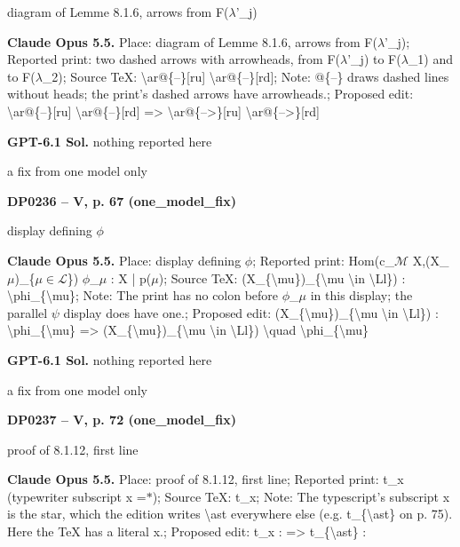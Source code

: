 diagram of Lemme 8.1.6, arrows from F(\ensuremath{\lambda}'\_j)\par
\textbf{Claude Opus 5.5.} Place: diagram of Lemme 8.1.6, arrows from F(\ensuremath{\lambda}'\_j); Reported print: two dashed arrows with arrowheads, from F(\ensuremath{\lambda}'\_j) to F(\ensuremath{\lambda}\_1) and to F(\ensuremath{\lambda}\_2); Source TeX: \textbackslash{}ar@\{--\}[ru] \textbackslash{}ar@\{--\}[rd]; Note: @\{--\} draws dashed lines without heads; the print's dashed arrows have arrowheads.; Proposed edit: \textbackslash{}ar@\{--\}[ru] \textbackslash{}ar@\{--\}[rd] =\allowbreak > \textbackslash{}ar@\{-->\}[ru] \textbackslash{}ar@\{-->\}[rd]\par
\textbf{GPT-6.1 Sol.} nothing reported here\par
a fix from one model only\par
\par\noindent\hypertarget{DP0236}{}\textbf{DP0236 -- V, p. 67 (one\_model\_fix)}\par
display defining \ensuremath{\phi}\par
\textbf{Claude Opus 5.5.} Place: display defining \ensuremath{\phi}; Reported print: Hom(c\_\ensuremath{\mathcal{M}} X,(X\_\ensuremath{\mu})\_\{\ensuremath{\mu}\ensuremath{\in}\ensuremath{\mathcal{L}}\})   \ensuremath{\phi}\_\ensuremath{\mu} : X | p(\ensuremath{\mu}); Source TeX: (X\_\{\textbackslash{}mu\})\_\{\textbackslash{}mu \textbackslash{}in \textbackslash{}Ll\}) : \textbackslash{}phi\_\{\textbackslash{}mu\}; Note: The print has no colon before \ensuremath{\phi}\_\ensuremath{\mu} in this display; the parallel \ensuremath{\psi} display does have one.; Proposed edit: (X\_\{\textbackslash{}mu\})\_\{\textbackslash{}mu \textbackslash{}in \textbackslash{}Ll\}) : \textbackslash{}phi\_\{\textbackslash{}mu\} =\allowbreak > (X\_\{\textbackslash{}mu\})\_\{\textbackslash{}mu \textbackslash{}in \textbackslash{}Ll\}) \textbackslash{}quad \textbackslash{}phi\_\{\textbackslash{}mu\}\par
\textbf{GPT-6.1 Sol.} nothing reported here\par
a fix from one model only\par
\par\noindent\hypertarget{DP0237}{}\textbf{DP0237 -- V, p. 72 (one\_model\_fix)}\par
proof of 8.1.12, first line\par
\textbf{Claude Opus 5.5.} Place: proof of 8.1.12, first line; Reported print: t\_x (typewriter subscript x =\allowbreak  \ensuremath{\ast}); Source TeX: t\_x; Note: The typescript's subscript x is the star, which the edition writes \textbackslash{}ast everywhere else (e.g. t\_\{\textbackslash{}ast\} on p. 75). Here the TeX has a literal x.; Proposed edit: t\_x : =\allowbreak > t\_\{\textbackslash{}ast\} :\par

